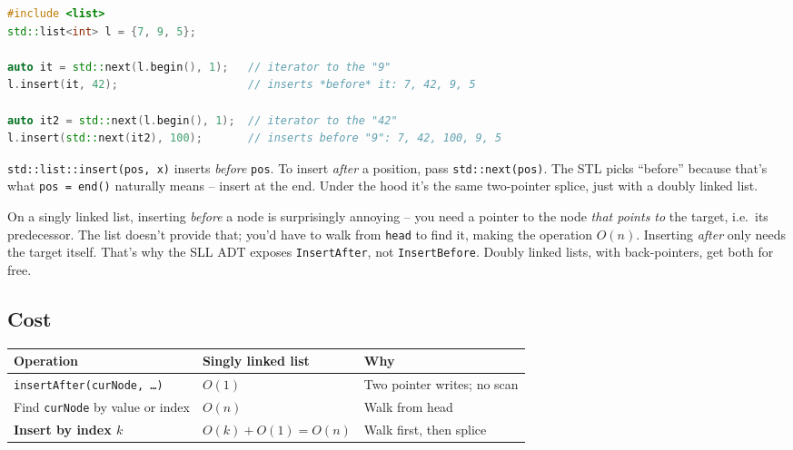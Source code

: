 \documentclass[11pt]{article}
\begin{document}
\begin{examplebox}
\begin{lstlisting}[basicstyle=\ttfamily\small,frame=single,language=C++]
#include <list>
std::list<int> l = {7, 9, 5};

auto it = std::next(l.begin(), 1);   // iterator to the "9"
l.insert(it, 42);                    // inserts *before* it: 7, 42, 9, 5

auto it2 = std::next(l.begin(), 1);  // iterator to the "42"
l.insert(std::next(it2), 100);       // inserts before "9": 7, 42, 100, 9, 5
\end{lstlisting}
\texttt{std::list::insert(pos, x)} inserts \emph{before}
\texttt{pos}. To insert \emph{after} a position, pass
\texttt{std::next(pos)}. The STL picks ``before'' because that's
what \texttt{pos = end()} naturally means -- insert at the end.
Under the hood it's the same two-pointer splice, just with a
doubly linked list.
\end{examplebox}

\begin{notebox}
On a singly linked list, inserting \emph{before} a node is
surprisingly annoying -- you need a pointer to the node \emph{that
points to} the target, i.e.\ its predecessor. The list doesn't
provide that; you'd have to walk from \texttt{head} to find it,
making the operation $O(n)$. Inserting \emph{after} only needs the
target itself. That's why the SLL ADT exposes
\texttt{InsertAfter}, not \texttt{InsertBefore}. Doubly linked
lists, with back-pointers, get both for free.
\end{notebox}

\subsection{Cost}

\begin{center}
\footnotesize
\renewcommand{\arraystretch}{1.3}
\begin{tabular}{@{}lll@{}}
\hline
\textbf{Operation}    & \textbf{Singly linked list} & \textbf{Why} \\
\hline
\texttt{insertAfter(curNode, \ldots)} & $O(1)$      & Two pointer writes; no scan \\
Find \texttt{curNode} by value or index & $O(n)$    & Walk from head \\
\textbf{Insert by index $k$}            & $O(k) + O(1) = O(n)$ & Walk first, then splice \\
\hline
\end{tabular}
\end{center}
\end{document}
